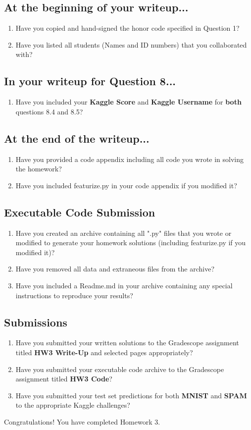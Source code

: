 \documentclass[11pt]{article}
\begin{document}
\subsection*{At the beginning of your writeup...}
\begin{enumerate}
    \item Have you copied and hand-signed the honor code specified in Question 1?
    \item Have you listed all students (Names and ID numbers) that you collaborated with?
\end{enumerate}
\subsection*{In your writeup for Question 8...}
\begin{enumerate}
\item Have you included your \textbf{Kaggle Score} and \textbf{Kaggle Username} for \textbf{both} questions 8.4 and 8.5?


\end{enumerate}
\subsection*{At the end of the writeup...}
\begin{enumerate}

\item Have you provided a code appendix including all code you wrote in solving the homework?
\item Have you included featurize.py in your code appendix if you modified it?
\end{enumerate}
\subsection*{Executable Code Submission}
\begin{enumerate}
    \item Have you created an archive containing all ".py" files that you wrote or modified to generate your homework solutions (including featurize.py if you modified it)?
    \item Have you removed all data and extraneous files from the archive?
    \item Have you included a Readme.md in your archive containing any special instructions to reproduce your results?
\end{enumerate}
\subsection*{Submissions}
\begin{enumerate}
    \item Have you submitted your written solutions to the Gradescope assignment titled \textbf{HW3 Write-Up} and selected pages appropriately?
    \item Have you submitted your executable code archive to the Gradescope assignment titled \textbf{HW3 Code}?
    \item Have you submitted your test set predictions for both \textbf{MNIST} and \textbf{SPAM} to the appropriate Kaggle challenges?
\end{enumerate}
Congratulations! You have completed Homework 3.
\end{document}
